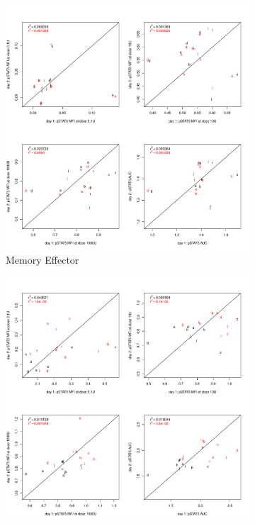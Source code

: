 \hspace{-2cm}
\begin{figure}[h]
\centering
\begin{subfigure}[b]{.4\textwidth}
  \includegraphics[scale=.25]{IL2/figures/repeatability-pstat5-mfi-Memory-Eff.pdf}
\caption{Memory Effector}
\end{subfigure}
\begin{subfigure}[b]{.4\textwidth}
  \includegraphics[scale=.25]{IL2/figures/repeatability-pstat5-mfi-Memory-Treg.pdf}

\end{subfigure}
\end{figure}
